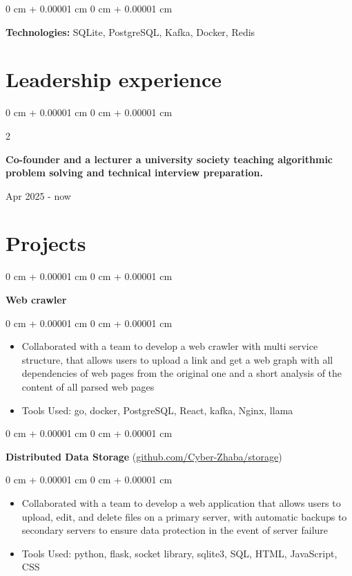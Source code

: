 \documentclass[10pt, letterpaper]{article}
\newenvironment{highlights}{
    \begin{itemize}[
        topsep=0.10 cm,
        parsep=0.10 cm,
        partopsep=0pt,
        itemsep=0pt,
        leftmargin=0 cm + 10pt
    ]
}{
    \end{itemize}
} %
\newenvironment{onecolentry}{
    \begin{adjustwidth}{
        0 cm + 0.00001 cm
    }{
        0 cm + 0.00001 cm
    }
}{
    \end{adjustwidth}
} %
\newenvironment{twocolentry}[2][]{
    \onecolentry
    \def\secondColumn{#2}
    \setcolumnwidth{\fill, 4.5 cm}
    \begin{paracol}{2}
}{
    \switchcolumn \raggedleft \secondColumn
    \end{paracol}
    \endonecolentry
} %
\begin{document}
        \vspace{0.20 cm}
        
        \begin{onecolentry}
            \textbf{Technologies:} SQLite, PostgreSQL, Kafka, Docker, Redis
        \end{onecolentry}

    \section{Leadership experience}
        \begin{twocolentry}{
            Apr 2025 - now
        }
        \textbf{Co-founder and a lecturer a university society teaching algorithmic problem solving and technical interview preparation. } 
        \end{twocolentry}



    \section{Projects}
        \begin{onecolentry}
            \textbf{Web crawler}\end{onecolentry}

        \vspace{0.10 cm}
        \begin{onecolentry}
            \begin{highlights}
                \item Collaborated with a team to develop a web crawler with multi service structure, that allows users to upload a link and get a web graph with all dependencies of web pages from the original one and a short analysis of the content of all parsed web pages 
                \item Tools Used: go, docker, PostgreSQL, React, kafka, Nginx, llama
            \end{highlights}
        \end{onecolentry}

        \vspace{0.2 cm}

        \begin{onecolentry}
            \textbf{Distributed Data Storage} (\href{https://github.com/Cyber-Zhaba/storage}{github.com/Cyber-Zhaba/storage})\end{onecolentry}

        \vspace{0.10 cm}
        \begin{onecolentry}
            \begin{highlights}
                \item Collaborated with a team to develop a web application that allows users to upload, edit, and delete files on a primary server, with automatic backups to secondary servers to ensure data protection in the event of server failure
                \item Tools Used: python, flask, socket library, sqlite3, SQL, HTML, JavaScript, CSS
            \end{highlights}
        \end{onecolentry}
\end{document}
